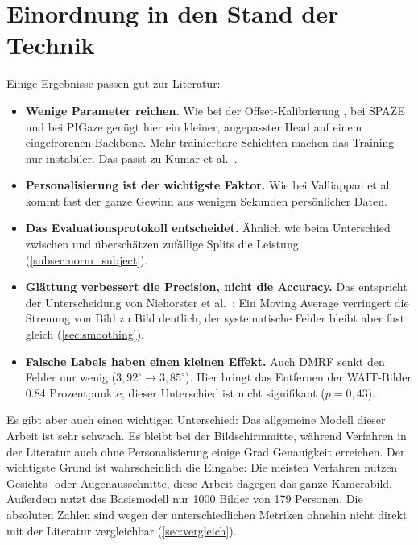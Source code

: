 \section{Einordnung in den Stand der Technik}
\label{sec:einordnung}
Einige Ergebnisse passen gut zur Literatur:
\begin{itemize}
  \item \textbf{Wenige Parameter reichen.} Wie bei der Offset-Kalibrierung
        \cite{chen2020offset}, bei SPAZE \cite{linden2019spaze} und bei PIGaze
        \cite{wang2026pigaze} genügt hier ein kleiner, angepasster Head auf
        einem eingefrorenen Backbone. Mehr trainierbare Schichten machen das
        Training nur instabiler. Das passt zu Kumar et
        al.~\cite{kumar2022finetuning}.
  \item \textbf{Personalisierung ist der wichtigste Faktor.} Wie bei
        Valliappan et al.~\cite{valliappan2020smartphone} kommt fast der ganze
        Gewinn aus wenigen Sekunden persönlicher Daten.
  \item \textbf{Das Evaluationsprotokoll entscheidet.} Ähnlich wie beim
        Unterschied zwischen  und 
        überschätzen zufällige Splits die Leistung
        (\cref{subsec:norm_subject}).
  \item \textbf{Glättung verbessert die Precision, nicht die Accuracy.} Das
        entspricht der Unterscheidung von Niehorster et
        al.~\cite{niehorster2026quality}: Ein Moving Average verringert die
        Streuung von Bild zu Bild deutlich, der systematische Fehler bleibt
        aber fast gleich (\cref{sec:smoothing}).
  \item \textbf{Falsche Labels haben einen kleinen Effekt.} Auch DMRF
        \cite{jiang2026dmrf} senkt den Fehler nur wenig
        ($3,92^\circ \rightarrow 3,85^\circ$). Hier bringt das Entfernen der
        WAIT-Bilder \num{0,84} Prozentpunkte; dieser Unterschied ist nicht
        signifikant ($p=0,43$).
\end{itemize}
Es gibt aber auch einen wichtigen Unterschied: Das allgemeine Modell dieser
Arbeit ist sehr schwach. Es bleibt bei der Bildschirmmitte, während
Verfahren in der Literatur auch ohne Personalisierung einige Grad Genauigkeit
erreichen. Der wichtigste Grund ist wahrscheinlich die Eingabe: Die meisten
Verfahren nutzen Gesichts- oder Augenausschnitte, diese Arbeit dagegen das
ganze Kamerabild. Außerdem nutzt das Basismodell nur \num{1000} Bilder von 179
Personen. Die absoluten Zahlen sind wegen der unterschiedlichen Metriken
ohnehin nicht direkt mit der Literatur vergleichbar (\cref{sec:vergleich}).

